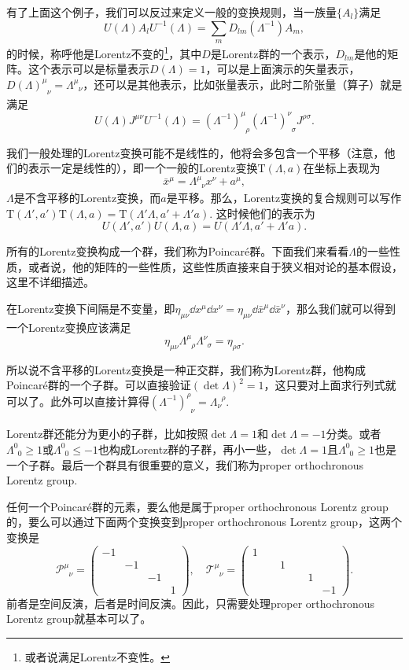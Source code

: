 \documentclass[9pt]{extbook}
\begin{document}
有了上面这个例子，我们可以反过来定义一般的变换规则，当一族量$\{A_l\}$满足
\[
	U(\Lambda) A_l U^{-1}(\Lambda)=\sum_{m}D_{lm}(\Lambda^{-1})A_m,
\]
的时候，称呼他是Lorentz不变的\footnote{或者说满足Lorentz不变性。}，其中$D$是Lorentz群的一个表示，$D_{lm}$是他的矩阵。这个表示可以是标量表示$D(\Lambda)=1$，可以是上面演示的矢量表示，$D(\Lambda)^\mu_{\phantom{\mu}\nu}=\Lambda^\mu_{\phantom{\mu}\nu}$，还可以是其他表示，比如张量表示，此时二阶张量（算子）就是满足
\[
	U(\Lambda) J^{\mu \nu}U^{-1}(\Lambda)=(\Lambda^{-1})^\mu_{\phantom{\mu}\rho}(\Lambda^{-1})^\nu_{\phantom{\nu}\sigma}J^{\rho \sigma}.
\]

我们一般处理的Lorentz变换可能不是线性的，他将会多包含一个平移（注意，他们的表示一定是线性的），即一个一般的Lorentz变换$\mathrm{T}(\Lambda,a)$在坐标上表现为
\[
\bar{x}^\mu=\Lambda^\mu_{\phantom{\mu}\nu}x^\nu+a^\mu,
\]
$\Lambda$是不含平移的Lorentz变换，而$a$是平移。那么，Lorentz变换的复合规则可以写作
$\mathrm{T}(\Lambda',a')\mathrm{T}(\Lambda,a)=\mathrm{T}(\Lambda'\Lambda,a'+\Lambda'a)$.
这时候他们的表示为
\[U(\Lambda',a')U(\Lambda,a)=U(\Lambda'\Lambda,a'+\Lambda'a).\]

所有的Lorentz变换构成一个群，我们称为Poincar\'{e}群。下面我们来看看$\Lambda$的一些性质，或者说，他的矩阵的一些性质，这些性质直接来自于狭义相对论的基本假设，这里不详细描述。

在Lorentz变换下间隔是不变量，即$\eta_{\mu\nu}\dd x^\mu\dd x^\nu=\eta_{\mu\nu}\dd \bar{x}^\mu\dd \bar{x}^\nu$，那么我们就可以得到一个Lorentz变换应该满足
\[
\eta_{\mu\nu}\Lambda^\mu_{\phantom{\mu}\rho}\Lambda^\nu_{\phantom{\nu}\sigma}=\eta_{\rho\sigma}.
\]

所以说不含平移的Lorentz变换是一种正交群，我们称为Lorentz群，他构成Poincar\'{e}群的一个子群。可以直接验证$(\det \Lambda)^2=1$，这只要对上面求行列式就可以了。此外可以直接计算得$(\Lambda^{-1})^\rho_{\phantom{\rho}\nu}=\Lambda_\nu^{\phantom{\nu}\rho}$.

Lorentz群还能分为更小的子群，比如按照$\det \Lambda=1$和$\det \Lambda=-1$分类。或者$\Lambda^0_{\phantom{0}0}\geq 1$或$\Lambda^0_{\phantom{0}0}\leq -1$也构成Lorentz群的子群，再小一些，$\det \Lambda=1$且$\Lambda^0_{\phantom{0}0}\geq 1$也是一个子群。最后一个群具有很重要的意义，我们称为proper orthochronous Lorentz group.

任何一个Poincar\'{e}群的元素，要么他是属于proper orthochronous Lorentz group的，要么可以通过下面两个变换变到proper orthochronous Lorentz group，这两个变换是
\[
\mathscr{P}^\mu_{\phantom{\mu}\nu}=\begin{pmatrix}-1&&&\\&-1&&\\&&-1&\\&&&1 \end{pmatrix},\quad \mathscr{T}^\mu_{\phantom{\mu}\nu}=\begin{pmatrix}1&&&\\&\phantom{-}1&&\\&&\phantom{-}1&\\&&&-1 \end{pmatrix}.
\]
前者是空间反演，后者是时间反演。因此，只需要处理proper orthochronous Lorentz group就基本可以了。
\end{document}
